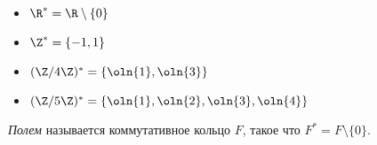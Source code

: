 \begin{examples}~
    \begin{itemize}
        \item $\R^* = \R \setminus \{0\}$
        \item $\Z^* = \{-1, 1\}$
        \item $(\Z/4\Z)^* = \{\oln{1}, \oln{3}\}$
        \item $(\Z/5\Z)^* = \{\oln{1}, \oln{2}, \oln{3}, \oln{4}\}$
    \end{itemize}
\end{examples}

\begin{defn}
    \emph{Полем} называется коммутативное кольцо $F$, такое что $F^* = F \setminus \{0\}$.
\end{defn}
